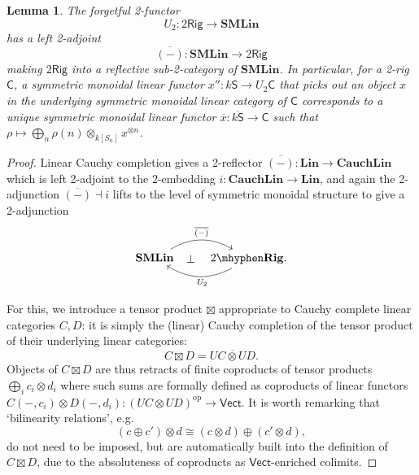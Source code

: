 \documentclass[12pt,reqno]{amsart}
\theoremstyle{plain}
\newtheorem{lem}[thm]{Lemma}
\theoremstyle{definition}
\theoremstyle{remark}
\newcommand{\maps}{\colon}
\newcommand{\op}{^\mathrm{op}}
\newcommand{\category}[1]{\mathsf{#1}}
\newcommand{\C}{\category C}
\renewcommand{\S}{\category S}
\newcommand{\namedcat}[1]{\mathsf{#1}}
\newcommand{\Rig}{\namedcat{Rig}}
\newcommand{\SMLin}{\namedbicat{SMLin}}
\newcommand{\TRig}{2\mhyphen\namedbicat{Rig}}
\newcommand{\Vect}{\namedcat{Vect}}
\newcommand{\namedbicat}[1]{\mathbf{#1}}
\newcommand{\Lin}{\namedbicat{Lin}}
\newcommand{\Cauch}{\namedbicat{Cauch}}
\newcommand{\ksbar}{\overline{k\S}}
\numberwithin{thm}{section}
\begin{document}
\begin{lem}
\label{lem:U2}
    The forgetful 2-functor
    \[ U_2 \maps 2\Rig \to \SMLin 
    \]
    has a left 2-adjoint
    \[  \overline{(-)} \maps \SMLin \to 2\Rig \]
    making $2\Rig$ into a reflective sub-2-category of
    $\SMLin$. In particular, for a 2-rig $\C$, a symmetric monoidal linear functor $x'' \maps k\S \to U_2\C$ that picks out an object $x$ in the underlying symmetric monoidal linear category of $\C$ corresponds to a unique symmetric monoidal linear functor $\overline x \maps \ksbar \to \C$ such that $\rho \mapsto \bigoplus_n \rho(n) \otimes_{k[S_n]} x^{\otimes n}$.
\end{lem}
\begin{proof}
    Linear Cauchy completion gives a 2-reflector $\overline{(-)} \maps \Lin \to \Cauch\Lin$ which is left 2-adjoint to the 2-embedding $i \maps \Cauch\Lin \to \Lin$, and again the 2-adjunction $\overline{(-)} \dashv i$ lifts to the level of symmetric monoidal structure to give a 2-adjunction 
    \[
    \begin{tikzcd}
        \SMLin
        \arrow[r, bend left, "\overline{(-)}"]
        \arrow[r, phantom, "\bot", pos = 0.45]
        &
        \TRig.
        \arrow[l, bend left, "U_2", pos = 0.45]
    \end{tikzcd}
    \]
    
    For this, we introduce a tensor product $\boxtimes$ appropriate to Cauchy complete linear categories $C, D$: it is simply the (linear) Cauchy completion of the tensor product of their underlying linear categories:
    \[   C \boxtimes D = \overline{UC \otimes UD}. \]
    Objects of $C \boxtimes D$ are thus retracts of finite coproducts of tensor products $\bigoplus_i c_i \otimes d_i$ where such sums are formally defined as coproducts of linear functors $C(-, c_i) \otimes D(-, d_i) \maps (UC \otimes UD)\op \to \Vect$. It is worth remarking that `bilinearity relations', e.g.
    \[ 
        (c \oplus c') \otimes d \cong (c \otimes d) \oplus (c' \otimes d), 
    \]
    do not need to be imposed, but are automatically built into the definition of $C \boxtimes D$, due to the absoluteness of coproducts as $\Vect$-enriched colimits.
    

\end{proof}
\end{document}
